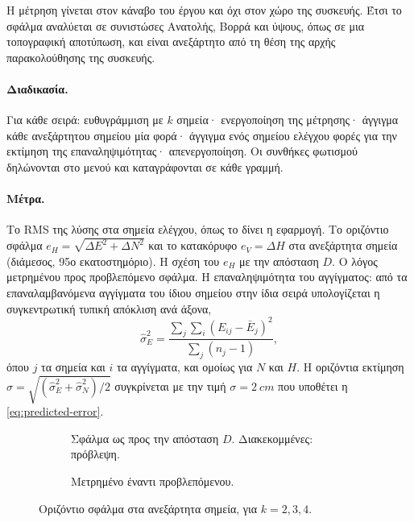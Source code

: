 Η μέτρηση γίνεται στον κάναβο του έργου και όχι στον χώρο της συσκευής. Έτσι το σφάλμα αναλύεται σε συνιστώσες Ανατολής, Βορρά και ύψους, όπως σε μια τοπογραφική αποτύπωση, και είναι ανεξάρτητο από τη θέση της αρχής παρακολούθησης της συσκευής.

\paragraph{Διαδικασία.} Για κάθε σειρά: ευθυγράμμιση με $k$ σημεία· ενεργοποίηση της μέτρησης· άγγιγμα κάθε ανεξάρτητου σημείου μία φορά· άγγιγμα ενός σημείου ελέγχου  φορές για την εκτίμηση της επαναληψιμότητας· απενεργοποίηση. Οι συνθήκες φωτισμού δηλώνονται στο μενού και καταγράφονται σε κάθε γραμμή.

\paragraph{Μέτρα.} Το RMS της λύσης στα σημεία ελέγχου, όπως το δίνει η εφαρμογή. Το οριζόντιο σφάλμα $e_H = \sqrt{\Delta E^2 + \Delta N^2}$ και το κατακόρυφο $e_V = \Delta H$ στα ανεξάρτητα σημεία (διάμεσος, 95ο εκατοστημόριο). Η σχέση του $e_H$ με την απόσταση $D$. Ο λόγος μετρημένου προς προβλεπόμενο σφάλμα. Η επαναληψιμότητα του αγγίγματος: από τα επαναλαμβανόμενα αγγίγματα του ίδιου σημείου στην ίδια σειρά υπολογίζεται η συγκεντρωτική τυπική απόκλιση ανά άξονα,
\begin{equation}
  \hat\sigma_E^2 = \frac{\sum_j \sum_i (E_{ij} - \bar E_j)^2}{\sum_j (n_j - 1)},
\end{equation}
όπου $j$ τα σημεία και $i$ τα αγγίγματα, και ομοίως για $N$ και $H$. Η οριζόντια εκτίμηση $\hat\sigma = \sqrt{(\hat\sigma_E^2 + \hat\sigma_N^2)/2}$ συγκρίνεται με την τιμή $\sigma = \SI{2}{cm}$ που υποθέτει η \cref{eq:predicted-error}.

\begin{table}[htbp]
  \centering\small
  \caption{Ακρίβεια ευθυγράμμισης ανά πλήθος σημείων ελέγχου $k$ ($N$: ανεξάρτητες μετρήσεις).}
  \label{tab:alignment-by-k}
\end{table}

\begin{figure}[htbp]
  \centering
  \begin{subfigure}{0.56\linewidth}
    \caption{Σφάλμα ως προς την απόσταση $D$. Διακεκομμένες: πρόβλεψη.}
    \label{fig:alignment-error}
  \end{subfigure}\hfill
  \begin{subfigure}{0.42\linewidth}
    \caption{Μετρημένο έναντι προβλεπόμενου.}
    \label{fig:alignment-pred}
  \end{subfigure}
  \caption{Οριζόντιο σφάλμα στα ανεξάρτητα σημεία, για $k = 2, 3, 4$.}
  \label{fig:alignment}
\end{figure}

